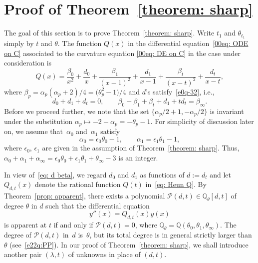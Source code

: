 \documentclass[11pt]{article}
\numberwithin{equation}{section}
\numberwithin{equation}{section}
\def\Q{\mathbb Q}
\begin{document}
\setcounter{section}{4}
\section{Proof of Theorem~\ref{theorem: sharp}}
\label{section: proof of Theorem 1.4}

The goal of this section is to prove Theorem~\ref{theorem: sharp}.
Write $t_1$ and $\theta_{t_1}$ simply by $t$ and $\theta$.
The function $Q(x)$ in the differential
equation~\eqref{00eq: ODE on C} associated to the curvature equation
\eqref{00eq: DE on C} in the case under consideration is
\begin{equation} \label{eq: Heun Q}
Q(x)=\frac{\beta_0}{x^2}+\frac{d_0}x
+\frac{\beta_1}{(x-1)^2}+\frac{d_1}{x-1}
+\frac{\beta_t}{(x-t)^2}+\frac{d_t}{x-t},
\end{equation}
where $\beta_p=\alpha_p(\alpha_p+2)/4=\bigl(\theta_p^2-1\bigr)/4$ and $d$'s
satisfy~\eqref{e0q-32}, i.e.,
\begin{equation} \label{eq: d beta}
d_0+d_1+d_t=0, \qquad
\beta_0+\beta_1+\beta_t+d_1+td_t=\beta_\infty.
\end{equation}
Before we proceed further, we note that the set
$\{\alpha_p/2+1,-\alpha_p/2\}$ is invariant under the substitution
$\alpha_p\mapsto-2-\alpha_p=-\theta_p-1$. For simplicity of discussion later on,
we assume that~$\alpha_0$ and~$\alpha_1$ satisfy
\begin{equation} \label{eq: choice of alpha}
\alpha_0=\epsilon_0\theta_0-1, \qquad
\alpha_1=\epsilon_1\theta_1-1,
\end{equation}
where $\epsilon_0$, $\epsilon_1$ are given in the assumption of Theorem~\ref{theorem: sharp}. Thus, $\alpha_0+\alpha_1+\alpha_\infty=\epsilon_0\theta_0
+\epsilon_1\theta_1+\theta_\infty-3$ is an integer.

In view of~\eqref{eq: d beta}, we regard $d_0$ and $d_1$ as
functions of $d:=d_t$ and let $Q_{d,t}(x)$ denote the rational function
$Q(t)$ in~\eqref{eq: Heun Q}. By Theorem~\ref{prop: apparent}, there
exists a polynomial $\mathcal P(d,t)\in\Q_{\theta}[d,t]$ of degree
$\theta$ in $d$ such that the differential equation
\begin{equation} \label{eq: Heun equation}
 y''(x)=Q_{d,t}(x)y(x)
\end{equation}
is apparent at $t$ if and only if $\mathcal P(d,t)=0$, where
$\Q_{\theta}=\Q(\theta_0,\theta_1,\theta_\infty)$. The degree of
$\mathcal P(d,t)$ in~$d$ is~$\theta$, but its total degree is in
general strictly larger than $\theta$ (see~\eqref{e22q:PP}).
In our proof of Theorem~\ref{theorem: sharp}, we shall introduce
another pair $(\lambda,t)$ of unknowns in place of $(d,t)$.
\end{document}
